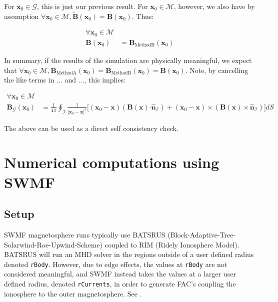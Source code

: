 \documentclass{article}
\newcommand\B{\mathbf{B}}
\newcommand\x{\mathbf{x}}
\newcommand\M{\mathcal{M}}
\newcommand\G{\mathcal{G}}
\newcommand\I{\mathcal{I}}
\newcommand\ifpi{\frac{1}{4\pi}}
\newcommand\normal[1]{\mathbf{\hat{n}}_{#1}}
\newcommand\surf[2]{\frac{1}{|\x_0-\x|^3} \Big[(\x_0-\x) (#2 \boldsymbol{\cdot} #1) + (\x_0-\x)\times (#2 \times #1) \Big]}
\newcommand\surfInt[1]     {\ifpi \oint_{#1} \surf{\normal{#1}}{\B(\x)} dS}
\begin{document}
For $\x_0 \in \G$, this is just our previous result.
For $\x_0 \in \M$, however, we also have by assumption $\forall \x_0 \in \M, \tilde{\B}(\x_0) = \B(\x_0)$.
Thus:

\begin{align}
\forall \x_0 \in \M \\
    \B(\x_0) &= \B_{\text{MethodB}}(\x_0)
\end{align}

In summary, if the results of the simulation are physically meaningful,
we expect that
$\forall \x_0 \in \M, \B_{\text{MethodA}}(\x_0) = \B_{\text{MethodB}}(\x_0) = \B(\x_0)$.
Note, by cancelling the like terms in ... and ...,
this implies:

\begin{align}
\forall \x_0 \in \M \\
    \B_{\G} (\x_0) &= \surfInt{\I}
\end{align}

The above can be used as a direct self consistency check.

\section{Numerical computations using SWMF} \label{computations}

\subsection{Setup}

SWMF magnetosphere runs typically use BATSRUS (Block-Adaptive-Tree-Solarwind-Roe-Upwind-Scheme) coupled to RIM (Ridely Ionosphere Model).
BATSRUS will run an MHD solver in the regions outside of a user defined radius denoted \texttt{rBody}.
However, due to edge effects, the values at \texttt{rBody} are not considered meaningful, and SWMF instead takes the values at a larger user defined radius, denoted \texttt{rCurrents}, in order to generate FAC's coupling the ionosphere to the outer magnetosphere. See \citep{Toth2005}.
\end{document}
